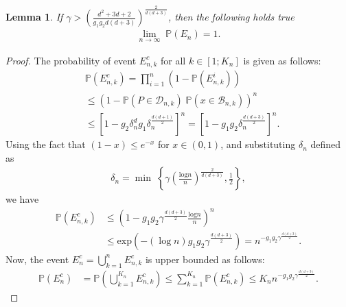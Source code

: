 \documentclass[Afour,sageh,times]{sagej}
\newtheorem{lemma}{\bf Lemma}
\begin{document}
\begin{lemma}
\normalfont If
$\gamma>\left(\frac{d^2+3d+2}{g_1 g_2 d(d+3)} \right)^\frac{2}{d(d+3)}$,
then the following holds true
\begin{align}
        \underset{n\rightarrow\infty}{\lim}\; \mathbb{P}\left(E_n \right)=1\nonumber.
\end{align}
\label{lemma:event_E_n}
\end{lemma}
\begin{proof}
The probability of event $E^c_{n,k}$ for all $k\in[1;K_n]$ is given as follows:
\begin{align}
   &\mathbb{P}\left(E^c_{n,k}\right)
   = \prod_{i=1}^{n}(1-\mathbb{P}\left(E^i_{n,k}\right))\nonumber\\
   &\leq \left(1- \mathbb{P}(P\in\mathcal{D}_{n,k}) \;     \mathbb{P}(x\in\mathcal{B}_{n,k})\right)^n\nonumber\\ \nonumber
   &\leq\left[1- g_2 \delta_n^d g_1 \delta_n^{\frac{d(d+1)}{2}} \right]^n = \left[1- g_1 g_2 \delta_n^{\frac{d(d+3)}{2}} \right]^n.
    \end{align}
Using the fact that $(1-x)\leq e^{-x}$ for $x\in(0,1)$, and substituting $\delta_n$ defined as
\begin{align}
    \delta_n=\min\;\left\{\gamma\left(\frac{\text{log}n}{n}\right)^\frac{2}{d(d+3)},\frac{1}{2}\right\},\nonumber
\end{align}
we have
\begin{align} \nonumber
 \mathbb{P}\left(E^c_{n,k}\right)&\leq \left(1-g_1 g_2
 {\gamma^{\frac{d(d+3)}{2}}\frac{\text{log}n}{n}} \right)^{n} \\ \nonumber
 &\leq \text{exp} \left( - (\log n) g_1 g_2 \gamma^{\frac{d(d+3)}{2}} \right)
 = n^{- g_1 g_2 \gamma^{\frac{d(d+3)}{2}}}.
\end{align}
Now, the event $E_n^c=\bigcup_{k=1}^n E^c_{n,k}$ is upper bounded as follows:
\begin{align}
  \mathbb{P}\left(E^c_{n}\right)& \!=\!\mathbb{P}\left(\bigcup_{k=1}^{K_n} E^c_{n,k}\right) 
 \! \leq \! \sum_{k=1}^{K_n}\mathbb{P}\left( E^c_{n,k}\right)\!\leq \! K_n n^{- g_1 g_2 \gamma^{\frac{d(d+3)}{2}}}.  \nonumber

\end{align}
\end{proof}
\end{document}
